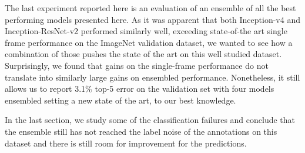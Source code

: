 The last experiment reported here is an evaluation of an ensemble of
all the best performing models  presented here. As it was
apparent that both Inception-v4 and Inception-ResNet-v2 performed
similarly well, exceeding state-of-the art single frame performance
on the ImageNet validation dataset, we wanted to see how a combination
of those pushes the state of the art on this well studied dataset.
Surprisingly, we found that gains on the single-frame performance do not
translate into similarly large gains on ensembled performance. Nonetheless,
it still allows us to report 3.1\% top-5 error on the validation set with
four models ensembled setting a new state of the art, to our best
knowledge.

In the last section, we study some of the classification failures and
conclude that the ensemble still has not reached the label noise of
the annotations on this dataset and there is still room for improvement
for the predictions.
